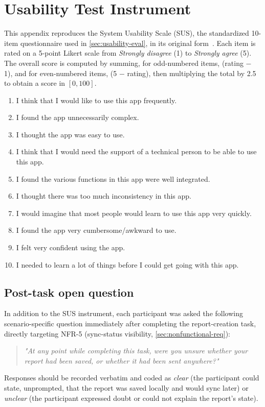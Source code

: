 \chapter{Usability Test Instrument}
\label{app:sus-questionnaire}

This appendix reproduces the System Usability Scale (SUS), the
standardized 10-item questionnaire used in \cref{sec:usability-eval}, in
its original form~\cite{brooke1996sus}. Each item is rated on a 5-point
Likert scale from \emph{Strongly disagree} (1) to \emph{Strongly agree}
(5). The overall score is computed by summing, for odd-numbered items,
(rating $-$ 1), and for even-numbered items, (5 $-$ rating), then
multiplying the total by 2.5 to obtain a score in $[0,100]$.

\begin{enumerate}
  \item I think that I would like to use this app frequently.
  \item I found the app unnecessarily complex.
  \item I thought the app was easy to use.
  \item I think that I would need the support of a technical person to be
  able to use this app.
  \item I found the various functions in this app were well integrated.
  \item I thought there was too much inconsistency in this app.
  \item I would imagine that most people would learn to use this app very
  quickly.
  \item I found the app very cumbersome/awkward to use.
  \item I felt very confident using the app.
  \item I needed to learn a lot of things before I could get going with
  this app.
\end{enumerate}

\section*{Post-task open question}

In addition to the SUS instrument, each participant was asked the
following scenario-specific question immediately after completing the
report-creation task, directly targeting NFR-5 (sync-status visibility,
\cref{sec:nonfunctional-req}):

\begin{quote}
\emph{"At any point while completing this task, were you unsure whether
your report had been saved, or whether it had been sent anywhere?"}
\end{quote}

Responses should be recorded verbatim and coded as \emph{clear} (the
participant could state, unprompted, that the report was saved locally
and would sync later) or \emph{unclear} (the participant expressed doubt
or could not explain the report's state).

